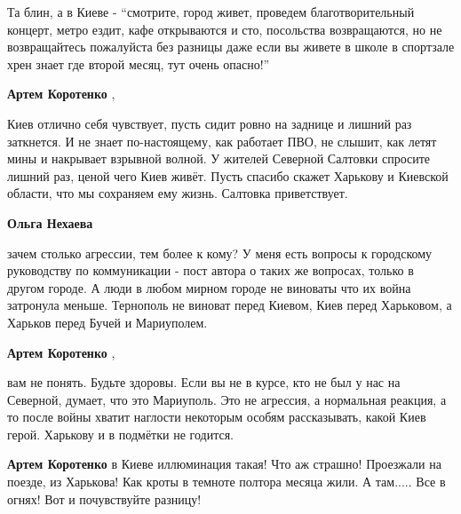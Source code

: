  
 
 
 
 
\zzSecCmt

\begin{itemize} %

Та блин, а в Киеве - \enquote{смотрите, город живет, проведем благотворительный
концерт, метро ездит, кафе открываются и сто, посольства возвращаются, но не
возвращайтесь пожалуйста без разницы даже если вы живете в школе в спортзале
хрен знает где второй месяц, тут очень опасно!}

\begin{itemize} %
\textbf{Артем Коротенко} , 

Киев отлично себя чувствует, пусть сидит ровно на заднице и лишний раз
заткнется. И не знает по-настоящему, как работает ПВО, не слышит, как летят
мины и накрывает взрывной волной. У жителей Северной Салтовки спросите лишний
раз, ценой чего Киев живёт. Пусть спасибо скажет Харькову и Киевской области,
что мы сохраняем ему жизнь. Салтовка приветствует.

\textbf{Ольга Нехаева} 

зачем столько агрессии, тем более к кому? У меня есть вопросы к городскому
руководству по коммуникации - пост автора о таких же вопросах, только в другом
городе. А люди в любом мирном городе не виноваты что их война затронула меньше.
Тернополь не виноват перед Киевом, Киев перед Харьковом, а Харьков перед Бучей
и Мариуполем.

\textbf{Артем Коротенко} , 

вам не понять. Будьте здоровы. Если вы не в курсе, кто не был у нас на
Северной, думает, что это Мариуполь. Это не агрессия, а нормальная реакция, а
то после войны хватит наглости некоторым особям рассказывать, какой Киев герой.
Харькову и в подмётки не годится.

\textbf{Артем Коротенко} в Киеве иллюминация такая! Что аж страшно! Проезжали на поезде, из Харькова! Как кроты в темноте полтора месяца жили. А там..... Все в огнях! Вот и почувствуйте разницу!


\end{itemize}
\end{itemize}
